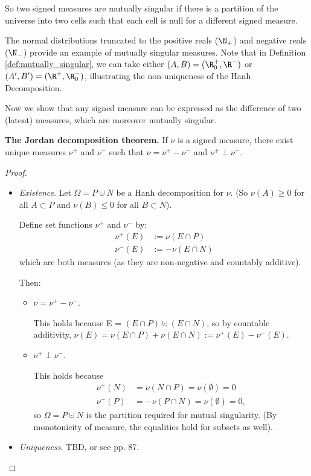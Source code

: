 \documentclass{article} %
\begin{document}
So two signed measures are mutually singular if there is a partition of the universe into two cells such that each cell is null for a different signed measure.

\begin{example}
The normal distributions truncated to the positive reals ($\N_+$) and negative reals ($\N_-$) provide an example of mutually singular measures.  Note that in Definition \ref{def:mutually_singular}, we can take either $(A,B)=(\R_0^+,\R^-)$  or $(A'
,B')=(\R^+,\R_0^-)$, illustrating the non-uniqueness of the Hanh Decomposition.
\end{example}

Now we show that any signed measure can be expressed as the difference of two (latent) measures, which are moreover mutually singular. 

\begin{theorem}{\textbf{The Jordan decomposition theorem.}}
If $\nu$ is a signed measure, there exist unique measures $\nu^+$ and $\nu^-$ such that $\nu = \nu^+ - \nu^-$ and $\nu^+ \perp \nu^-$.
\end{theorem}

\begin{proof}
\begin{itemize}
\item \textit{Existence}.  Let $\Omega = P \cupdot N$ be a Hanh decomposition for $\nu$. {\tiny (So $\nu(A) \geq 0$ for all $A \subset P$ and  $\nu(B) \leq 0$ for all $B \subset N$)}. 

Define set functions $\nu^+$ and $\nu^-$ by:
\begin{align*}
\nu^+(E) &:= \nu(E \cap P) \\
\nu^-(E) &:= -\nu(E \cap N)
\end{align*}
which are both measures {\tiny (as they are non-negative and countably additive)}.  

Then:
	\begin{itemize}
	\item $\nu = \nu^+ - \nu^-$.  
	
	{\tiny This holds because E = $(E \cap P) \cupdot (E \cap N)$, so by countable additivity, $\nu(E) = \nu(E \cap P) + \nu(E \cap N) := \nu^+(E) - \nu^-(E)$. 
	}
	\item $\nu^+ \perp \nu^-$.
	
	{\tiny This holds because \begin{align*}
 		\nu^+(N) &= \nu(N \cap P) = \nu(\emptyset) =  0 \\
 		\nu^-(P) &= -\nu(P \cap N) = \nu(\emptyset) = 0,
 		\end{align*}
so $\Omega = P \cupdot N$ is the partition required for mutual singularity. (By monotonicity of measure, the equalities hold for subsets as well).}
	\end{itemize}

\item \textit{Uniqueness}.  TBD, or see \cite{folland1999real} pp. 87.	
\end{itemize}
	
\end{proof}
\end{document}
